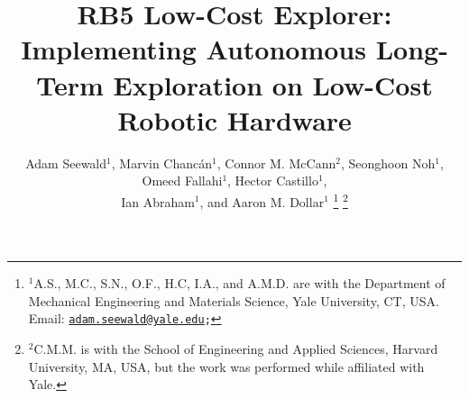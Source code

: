 \documentclass[letterpaper,10pt,conference,twoside]{IEEEtran}
\theoremstyle{definition}
\begin{document}

\title{\LARGE\bf RB5 Low-Cost Explorer: Implementing Autonomous Long-Term Exploration on Low-Cost Robotic Hardware}%

\author{Adam Seewald${}^\text{1}$, Marvin Chanc{\'a}n${}^\text{1}$, Connor M. McCann${}^\text{2}$, Seonghoon Noh${}^\text{1}$, Omeed Fallahi${}^\text{1}$, Hector Castillo${}^\text{1}$,\\ %
Ian Abraham${}^\text{1}$, and Aaron M. Dollar${}^\text{1}$%
  \thanks{${}^\text{1}$A.\hspace*{.4ex}S., M.\hspace*{.4ex}C., S.\hspace*{.4ex}N., O.\hspace*{.4ex}F., H.\hspace*{.4ex}C, I.\hspace*{.4ex}A., and A.\hspace*{.4ex}M.\hspace*{.4ex}D. are with the Department of Mechanical Engineering and Materials Science, Yale University, CT, USA. Email: {\tt\footnotesize \href{mailto:adam.seewald@yale.edu}{adam.seewald@yale.edu};}}
  \thanks{${}^\text{2}$C.\hspace*{.4ex}M.\hspace*{.4ex}M. is with the School of Engineering and Applied Sciences, Harvard University, MA, USA, but the work was performed while affiliated with Yale.}
}
\end{document}
